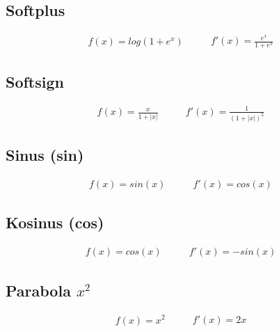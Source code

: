 \documentclass[times, utf8, diplomski]{fer}
\begin{document}
\subsection*{Softplus}
\begin{equation}
\begin{split}
f(x) = log(1+e^x)
\end{split}
\qquad
\begin{split}
f'(x) = \frac{e^x}{1+e^x}
\end{split}
\end{equation}

\subsection*{Softsign}
\begin{equation}
\begin{split}
f(x) = \frac{x}{1+|x|}
\end{split}
\qquad
\begin{split}
f'(x) = \frac{1}{(1+|x|)^2}
\end{split}
\end{equation}

\subsection*{Sinus (sin)}
\begin{equation}
\begin{split}
f(x) = sin(x)
\end{split}
\qquad
\begin{split}
f'(x) = cos(x)
\end{split}
\end{equation}

\subsection*{Kosinus (cos)}
\begin{equation}
\begin{split}
f(x) = cos(x)
\end{split}
\qquad
\begin{split}
f'(x) = -sin(x)
\end{split}
\end{equation}

\subsection*{Parabola $x^2$}
\begin{equation}
\begin{split}
f(x) = x^2
\end{split}
\qquad
\begin{split}
f'(x) = 2x
\end{split}
\end{equation}
\end{document}
